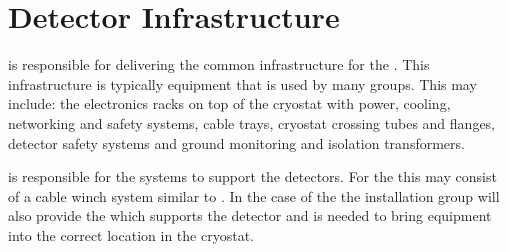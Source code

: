 \section{Detector Infrastructure}
\label{sec:fdsp-coord-infrastructure}

 is responsible for delivering the common infrastructure for
the . This infrastructure is typically equipment that is used
by many groups. This may include: the electronics racks on top of the
cryostat with power, cooling, networking and safety systems, cable
trays, cryostat crossing tubes and flanges, detector safety systems
and ground monitoring and isolation transformers.

 is responsible for the systems to support the
detectors. For the  this may consist of a cable
winch system similar to .  In the case of the
 the installation group will also provide the
 which supports the detector and is needed to bring
equipment into the correct location in the cryostat.
